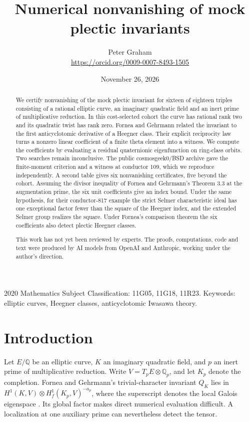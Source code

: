 \documentclass[11pt]{article}
\title{Numerical nonvanishing of mock plectic invariants}
\author{Peter Graham\\ \small\url{https://orcid.org/0009-0007-8493-1505}}
\date{November 26, 2026}
\newcommand{\Q}{\mathbb Q}
\begin{document}
\maketitle
\begin{abstract}
We certify nonvanishing of the mock plectic invariant for sixteen of eighteen triples consisting of a rational elliptic curve, an imaginary quadratic field and an inert prime of multiplicative reduction. In this cost-selected cohort the curve has rational rank two and its quadratic twist has rank zero. Fornea and Gehrmann related the invariant to the first anticyclotomic derivative of a Heegner class. Their explicit reciprocity law turns a nonzero linear coefficient of a finite theta element into a witness. We compute the coefficients by evaluating a residual quaternionic eigenfunction on ring-class orbits. Two searches remain inconclusive. The public cosmosgeek0/BSD archive gave the finite-moment criterion and a witness at conductor 109, which we reproduce independently. A second table gives six nonvanishing certificates, five beyond the cohort. Assuming the divisor inequality of Fornea and Gehrmann's Theorem 3.3 at the augmentation prime, the six unit coefficients give an index bound. Under the same hypothesis, for their conductor-817 example the strict Selmer characteristic ideal has one exceptional factor fewer than the square of the Heegner index, and the extended Selmer group realizes the square. Under Fornea's comparison theorem the six coefficients also detect plectic Heegner classes.

This work has not yet been reviewed by experts. The proofs, computations, code and text were produced by AI models from OpenAI and Anthropic, working under the author's direction.
\end{abstract}
\medskip
\noindent\small 2020 Mathematics Subject Classification: 11G05, 11G18, 11R23.
\quad Keywords: elliptic curves, Heegner classes, anticyclotomic Iwasawa theory.\normalsize

\section{Introduction}
Let $E/\Q$ be an elliptic curve, $K$ an imaginary quadratic field, and $p$ an inert prime of multiplicative reduction. Write $V=T_pE\otimes\Q_p$, and let $K_p$ denote the completion. Fornea and Gehrmann's trivial-character invariant $Q_K$ lies in $H^1(K,V)\otimes H^1_f(K_p,V)^{-a_p}$, where the superscript denotes the local Galois eigenspace \cite[(13), Proposition 2.11]{FG}. Its global factor makes direct numerical evaluation difficult. A localization at one auxiliary prime can nevertheless detect the tensor.
\end{document}
